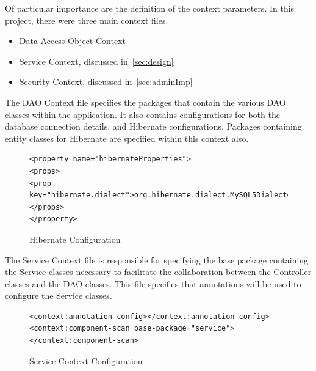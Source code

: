Of particular importance are the definition of the context parameters. In this project, there were three main context files.

\begin{itemize}
\item Data Access Object Context
\item Service Context, discussed in~\ref{sec:design}
\item Security Context, discussed in~\ref{sec:adminImp}
\end{itemize}

The DAO Context file specifies the packages that contain the various DAO classes within the application. It also contains configurations for both the database connection details, and Hibernate configurations. Packages containing entity classes for Hibernate are specified within this context also. \newline

\begin{figure}
\begin{lstlisting}
<property name="hibernateProperties">
<props>
<prop key="hibernate.dialect">org.hibernate.dialect.MySQL5Dialect</prop>
</props>
</property>
\end{lstlisting}
\caption{Hibernate Configuration}
\end{figure}


The Service Context file is responsible for specifying the base package containing the Service classes necessary to facilitate the collaboration between the Controller classes and the DAO classes. This file specifies that annotations will be used to configure the Service classes.\newline
\begin{figure}
\begin{lstlisting}
<context:annotation-config></context:annotation-config>
<context:component-scan base-package="service"></context:component-scan>
\end{lstlisting}
\caption{Service Context Configuration}
\end{figure}

